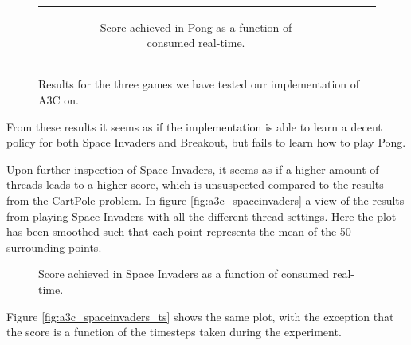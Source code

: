 \documentclass[11pt]{article}
\begin{document}
\begin{figure}[H]
\begin{tabular}[c]{ccc}
\begin{subfigure}[t]{.32\textwidth}
        \caption{Score achieved in Pong as a function of
        consumed real-time.}
    \end{subfigure}
  \end{tabular}
  \label{fig:all_atari}
  \caption{Results for the three games we have tested our implementation
           of A3C on.}
\end{figure}

From these results it seems as if the implementation is able to learn
a decent policy for both Space Invaders and Breakout, but fails
to learn how to play Pong.

Upon further inspection of Space Invaders, it seems as if
a higher amount of threads leads to a higher score, which is unsuspected
compared to the results from the CartPole problem.
In figure \ref{fig:a3c_spaceinvaders} a view of the results from
playing Space Invaders with all the different thread settings.
Here the plot has been smoothed such that each point represents the mean of the
50 surrounding points.

\begin{figure}[H]
    \caption{Score achieved in Space Invaders as a function of
    consumed real-time.}
    \label{fig:a3c_spaceinvader}
\end{figure}

Figure \ref{fig:a3c_spaceinvaders_ts} shows the same plot, with the
exception that the score is a function of the timesteps taken
during the experiment.
\end{document}
